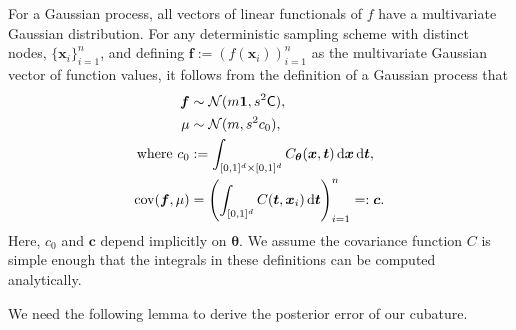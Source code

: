 \documentclass{svjour3}                     %
\newcommand{\bm}[1]{\boldsymbol{#1}}
\newcommand{\dif}[1]{\text{d}{#1}}
\newcommand{\D}[1]{\text{d}{#1}}
\newcommand{\vtheta}{{\bm{\theta}}}
\newcommand{\vc}{\bm{c}}
\newcommand{\vf}{\bm{f}}
\newcommand{\vt}{\bm{t}}
\newcommand{\vx}{\bm{x}}
\newcommand{\vone}{\bm{1}}
\newcommand{\mC}{\mathsf{C}}
\newcommand{\cov}{{\textup{cov}}}
\newcommand{\calN}{\mathcal{N}}
\begin{document}
For a Gaussian process, all vectors of linear functionals of $f$ have a multivariate Gaussian distribution. 
For any deterministic sampling scheme with distinct nodes, $\{\vx_i\}_{i=1}^n$, and defining  $\vf  := \left( f(\vx_i)\right)_{i=1}^n$ as the multivariate Gaussian vector of function values, it follows from the definition of a Gaussian process that 
\begin{subequations} \label{eqn:fGaussDist}
	\begin{align}
	\vf  & \sim \calN(m \vone, s^2 \mC), \\
	\mu & \sim \calN(m, s^2 c_0), 
	\\
	\text{where }
	c_0 &:= \int_{[0,1]^{d} \times [0,1]^{d}} C_\vtheta(\vx,\vt) \, \dif{\vx} \, \dif{\vt}, \\
	\cov(\vf, \mu) &= \left(  \int_{[0,1]^d} C(\vt,\vx_i) \, \D \vt \right)_{i=1}^n  =: \vc.
	\end{align}
\end{subequations}
Here, $c_0$ and $\vc$ depend implicitly on $\vtheta$.  We assume the covariance function $C$ is simple enough that the integrals in these definitions can be computed analytically.

\iffalse
We need the following lemma to derive the posterior error of our cubature. 
\end{document}
